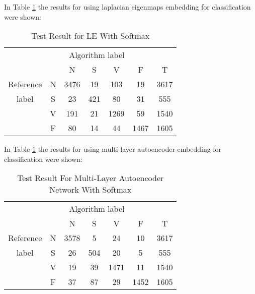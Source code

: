 \documentclass[journal]{IEEEtran}
\begin{document}

In Table \ref{Laplacian} the results for using laplacian eigenmaps  embedding for classification were shown:


\begin{table}[!htbp]
\begin{center}
\begin{threeparttable}
\caption{Test Result for LE With Softmax}
\label{Laplacian}
\begin{tabular}{ccccccc}
\hline
\multicolumn{5}{r}{Algorithm label} \\
\cline{3-6}
		&  & N & S      & V    & F       & T\\
\hline
 Reference & N & 3476 & 19  &  103 & 19    &  3617 \\
	label  & S &  23    & 421  &   80   & 31    &  555\\
		   & V &  191    & 21    & 1269 & 59    &  1540\\
		   & F &  80   & 14    & 44    & 1467   &  1605\\		
\hline
\end{tabular}

\end{threeparttable}
\end{center}
\end{table}



In Table \ref{Laplacian} the results for using multi-layer autoencoder embedding for classification were shown:


\begin{table}[!htbp]
\begin{center}
\begin{threeparttable}
\caption{Test Result For Multi-Layer Autoencoder Network With Softmax}
\label{table7}
\begin{tabular}{ccccccc}
\hline
\multicolumn{5}{r}{Algorithm label} \\
\cline{3-6}
		&  & N & S      & V    & F       & T\\
\hline
 Reference & N & 3578 & 5 &  24   & 10    &  3617 \\
	label  & S &  26    &504  &  20   & 5    &  555\\
		   & V &  19    & 39    & 1471 & 11    &  1540\\
		   & F &  37    & 87    & 29    & 1452   &  1605\\		
\hline
\end{tabular}
\end{threeparttable}
\end{center}
\end{table}
\end{document}

